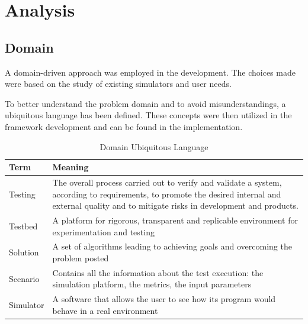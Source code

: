 \documentclass[12pt,a4paper,openright,twoside]{book}
\begin{document}
\chapter{Analysis}

\section{Domain}

A domain-driven approach was employed in the development. The choices made were based on the study of existing simulators and user needs.

To better understand the problem domain and to avoid misunderstandings, a ubiquitous language has been defined.
These concepts were then utilized in the framework development and can be found in the implementation.

\begin{table}[h]
  \centering
  \begin{tabular}{|l|p{}|}
    \toprule
    \textbf{Term} & \textbf{Meaning}                                                                                                                                                                                    \\
    \midrule
    Testing       & The overall process carried out to verify and validate a system, according to requirements, to promote the desired internal and external quality and to mitigate risks in development and products. \\ \hline
    Testbed       & A platform for rigorous, transparent and replicable environment for experimentation and testing                                                                                                     \\ \hline
    Solution      & A set of algorithms leading to achieving goals and overcoming the problem posted                                                                                                                    \\ \hline
    Scenario      & Contains all the information about the test execution: the simulation platform, the metrics, the input parameters                                                                                   \\ \hline
    Simulator     & A software that allows the user to see how its program would behave in a real environment                                                                                                           \\ \hline
  \end{tabular}
  \caption{Domain Ubiquitous Language}
\end{table}
\end{document}

